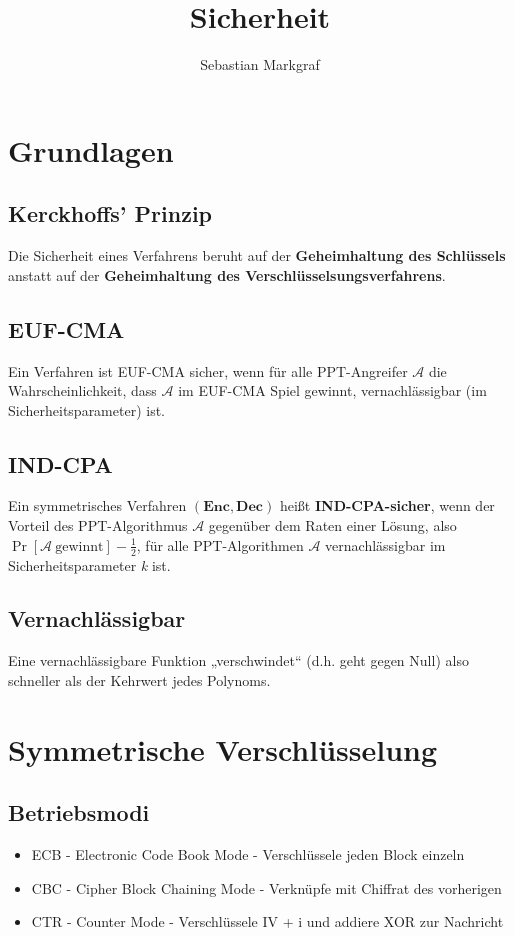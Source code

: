 \documentclass[10pt,a4paper]{article}
\author{Sebastian Markgraf}
\title{Sicherheit}
\begin{document}
	{\let\newpage\relax\maketitle}
	\tableofcontents
	\newpage
	\setcounter{page}{1}

        \section{Grundlagen}
        \subsection{Kerckhoffs' Prinzip}
        Die Sicherheit eines Verfahrens beruht auf der \textbf{Geheimhaltung des Schlüssels}
        anstatt auf der \textbf{Geheimhaltung des Verschlüsselsungsverfahrens}.

        \subsection{EUF-CMA}
        Ein Verfahren ist EUF-CMA sicher, wenn für alle PPT-Angreifer \(\mathcal{A}\) die Wahrscheinlichkeit,
        dass \(\mathcal{A}\) im EUF-CMA Spiel gewinnt, vernachlässigbar (im Sicherheitsparameter) ist.

        \subsection{IND-CPA}
        Ein symmetrisches Verfahren \((\mathbf{Enc}, \mathbf{Dec})\) heißt \textbf{IND-CPA-sicher}, wenn der Vorteil des
        PPT-Algorithmus \(\mathcal{A}\) gegenüber dem Raten einer Lösung, also
        \(\Pr\left[\mathcal{A}\ \text{gewinnt}\right] - \frac{1}{2}\), für alle
        PPT-Algorithmen \(\mathcal{A}\) vernachlässigbar im Sicherheitsparameter \textit{k} ist.

        \subsection{Vernachlässigbar}
        Eine vernachlässigbare Funktion „verschwindet“ (d.h. geht gegen Null) also schneller als der
        Kehrwert jedes Polynoms.
        \newpage

	\section{Symmetrische Verschlüsselung}
        \subsection{Betriebsmodi}
        \begin{itemize}
        \item ECB - Electronic Code Book Mode - Verschlüssele jeden Block einzeln
        \item CBC - Cipher Block Chaining Mode - Verknüpfe mit Chiffrat des vorherigen
        \item CTR - Counter Mode - Verschlüssele IV + i und addiere XOR zur Nachricht
        \end{itemize}
        \newpage
        
\end{document}
